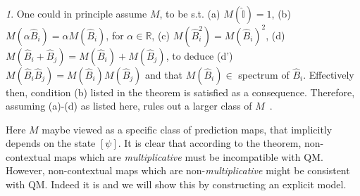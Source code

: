 \documentclass[british,aps,prl,superscriptaddress,nofootinbib,times,reprint]{revtex4-1}
\theoremstyle{plain}
\theoremstyle{plain}
\theoremstyle{definition}
\theoremstyle{remark}
\newtheorem*{rem}{\protect\remarkname}
\theoremstyle{remark}
\theoremstyle{remark}
\theoremstyle{plain}
\theoremstyle{plain}
\theoremstyle{plain}
\theoremstyle{definition}
\theoremstyle{definition}
\providecommand{\remarkname}{Remark}
\begin{document}
\begin{rem} One could in principle assume $M$, to
be s.t. (a) $M(\hat{\mathbb{I}})=1$, (b)
$M(\alpha\hat{B}_{i})=\alpha M(\hat{B}_{i})$, for
$\alpha\in\mathbb{R}$, (c)
$M(\hat{B}_{i}^{2})=M(\hat{B}_{i})^{2}$, (d)
$M(\hat{B}_{i}+\hat{B}_{j})=M(\hat{B}_{i})+M(\hat{B}_{j})$,
to deduce (d')
$M(\hat{B}_{i}\hat{B}_{j})=M(\hat{B}_{i})M(\hat{B}_{j})$
and that $M(\hat{B}_{i})\in$ spectrum of
$\hat{B}_{i}$. Effectively then, condition (b)
listed in the theorem is satisfied as a
consequence.  Therefore, assuming (a)-(d) as
listed here, rules out a larger class of $M$~\cite{KochenSpecker}.
\end{rem} 
Here $M$ maybe viewed as a specific
class of prediction maps, that implicitly depends
on the state $[\psi]$. It is clear that according to
the theorem, non-contextual maps which are
\emph{multiplicative} must be incompatible with
QM. However, non-contextual maps which are
non-\emph{multiplicative} might be consistent with
QM. Indeed it is and we will show this by constructing an
explicit model.
\end{document}
